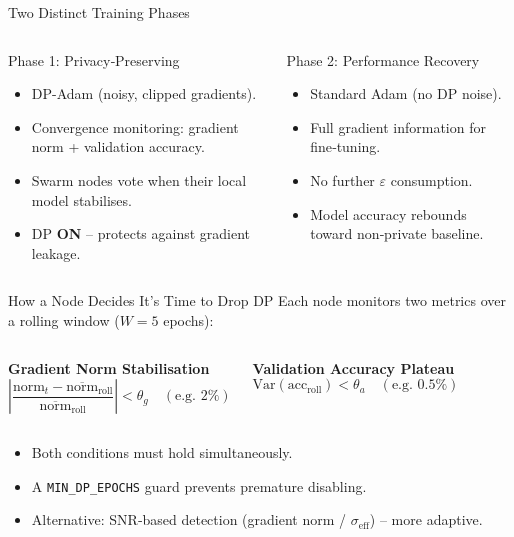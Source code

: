 \documentclass[aspectratio=169]{beamer}
\begin{document}
\begin{frame}{Two Distinct Training Phases}
\begin{columns}[T]
\begin{block}{Phase 1: Privacy‑Preserving}
\begin{itemize}
    \item DP-Adam (noisy, clipped gradients).
    \item Convergence monitoring: gradient norm + validation accuracy.
    \item Swarm nodes vote when their local model stabilises.
    \item DP \textbf{ON} – protects against gradient leakage.
\end{itemize}
\end{block}

\begin{block}{Phase 2: Performance Recovery}
\begin{itemize}
    \item Standard Adam (no DP noise).
    \item Full gradient information for fine‑tuning.
    \item No further $\varepsilon$ consumption.
    \item Model accuracy rebounds toward non‑private baseline.
\end{itemize}
\end{block}
\end{columns}
\end{frame}

\begin{frame}{How a Node Decides It’s Time to Drop DP}
Each node monitors two metrics over a rolling window ($W=5$ epochs):

\vspace{0.3cm}
\begin{columns}[t]
\textbf{Gradient Norm Stabilisation}
\[
\left|\frac{\text{norm}_t - \overline{\text{norm}}_{\text{roll}}}
           {\overline{\text{norm}}_{\text{roll}}}\right| 
           < \theta_g \quad (\text{e.g. } 2\%)
\]

\textbf{Validation Accuracy Plateau}
\[
\mathrm{Var}(\text{acc}_{\text{roll}}) 
    < \theta_a \quad (\text{e.g. } 0.5\%)
\]
\end{columns}

\vspace{0.4cm}
\begin{itemize}
    \item Both conditions must hold simultaneously.
    \item A \texttt{MIN\_DP\_EPOCHS} guard prevents premature disabling.
    \item Alternative: SNR‑based detection (gradient norm / $\sigma_{\text{eff}}$) – more adaptive.
\end{itemize}
\end{frame}
\end{document}
